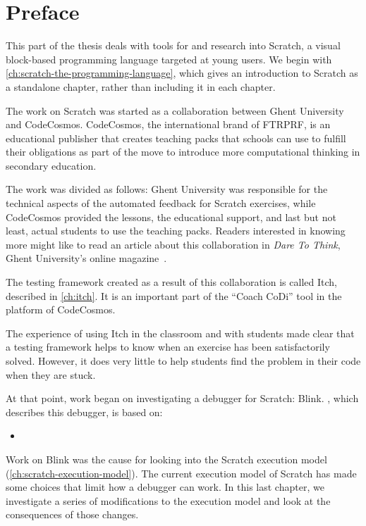 \documentclass[./main]{subfiles}
\begin{document}
\chapter*{Preface}

This part of the thesis deals with tools for and research into Scratch, a visual block-based programming language targeted at young users.
We begin with \cref{ch:scratch-the-programming-language}, which gives an introduction to Scratch as a standalone chapter, rather than including it in each chapter.

The work on Scratch was started as a collaboration between Ghent University and CodeCosmos.
CodeCosmos, the international brand of FTRPRF, is an educational publisher that creates teaching packs that schools can use to fulfill their obligations as part of the move to introduce more computational thinking in secondary education.

The work was divided as follows: Ghent University was responsible for the technical aspects of the automated feedback for Scratch exercises, while CodeCosmos provided the lessons, the educational support, and last but not least, actual students to use the teaching packs.
Readers interested in knowing more might like to read an article about this collaboration in \textit{Dare To Think}, Ghent University's online magazine~\autocite{daretothinkCoachCoDiMotivationboosting2023}.

The testing framework created as a result of this collaboration is called Itch, described in \cref{ch:itch}.
It is an important part of the ``Coach CoDi'' tool in the platform of CodeCosmos.

The experience of using Itch in the classroom and with students made clear that a testing framework helps to know when an exercise has been satisfactorily solved.
However, it does very little to help students find the problem in their code when they are stuck.

At that point, work began on investigating a debugger for Scratch: Blink.
, which describes this debugger, is based on:

\begin{itemize}
    \item {}
\end{itemize}

Work on Blink was the cause for looking into the Scratch execution model (\cref{ch:scratch-execution-model}).
The current execution model of Scratch has made some choices that limit how a debugger can work.
In this last chapter, we investigate a series of modifications to the execution model and look at the consequences of those changes.
\end{document}
